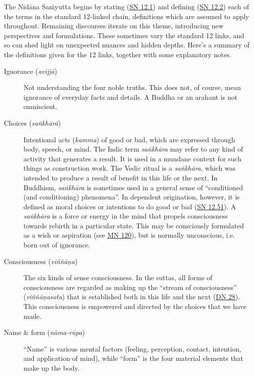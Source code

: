 \documentclass[12pt,openany]{book}%
\begin{document}
The \textsanskrit{Nidāna} \textsanskrit{Saṁyutta} begins by stating (\href{https://suttacentral.net/sn12.1}{SN 12.1}) and defining (\href{https://suttacentral.net/sn12.2}{SN 12.2}) each of the terms in the standard 12-linked chain, definitions which are assumed to apply throughout. Remaining discourses iterate on this theme, introducing new perspectives and formulations. These sometimes vary the standard 12 links, and so can shed light on unexpected nuances and hidden depths. Here’s a summary of the definitions given for the 12 links, together with some explanatory notes.

\begin{description}%
\item[Ignorance (\textit{\textsanskrit{avijjā}})] Not understanding the four noble truths.
This does not, of course, mean ignorance of everyday facts and details. A Buddha or an arahant is not omniscient.%
\item[Choices (\textit{\textsanskrit{saṅkhārā}})] Intentional acts (\textit{kamma}) of good or bad, which are expressed through body, speech, or mind.
The Indic term \emph{\textsanskrit{saṅkhāra}} may refer to any kind of activity that generates a result. It is used in a mundane context for such things as construction work. The Vedic ritual is a \emph{\textsanskrit{saṅkhāra}}, which was intended to produce a result of benefit in this life or the next. In Buddhism, \emph{\textsanskrit{saṅkhāra}} is sometimes used in a general sense of “conditioned (and conditioning) phenomena”. In dependent origination, however, it is defined as moral choices or intentions to do good or bad (\href{https://suttacentral.net/sn12.51}{SN 12.51}). A \emph{\textsanskrit{saṅkhāra}} is a force or energy in the mind that propels consciousness towards rebirth in a particular state. This may be consciously formulated as a wish or aspiration (see \href{https://suttacentral.net/mn120}{MN 120}), but is normally unconscious, i.e. born out of ignorance.%
\item[Consciousness (\textit{\textsanskrit{viññāṇa}})] The six kinds of sense consciousness.
In the suttas, all forms of consciousness are regarded as making up the “stream of consciousness” (\textit{\textsanskrit{viññāṇasota}}) that is established both in this life and the next (\href{https://suttacentral.net/dn28}{DN 28}). This consciousness is empowered and directed by the choices that we have made.%
\item[Name \& form (\textit{\textsanskrit{nāma}-\textsanskrit{rūpa}})] “Name” is various mental factors (feeling, perception, contact, intention, and application of mind), while “form” is the four material elements that make up the body.

\end{description}
\end{document}
